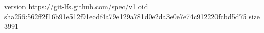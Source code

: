 version https://git-lfs.github.com/spec/v1
oid sha256:562ff2f16b91e512f91ecdf4a79e129a781d0e2da3e0e7e74c912220fcbd5d75
size 3991
